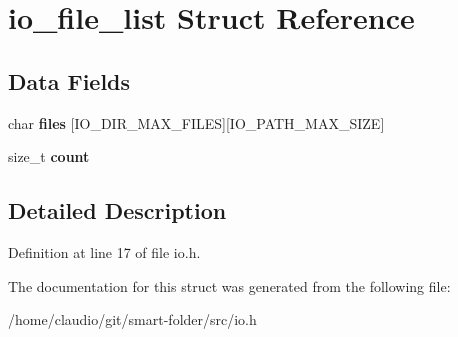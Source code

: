 \hypertarget{structio__file__list}{}\section{io\+\_\+file\+\_\+list Struct Reference}
\label{structio__file__list}
\subsection*{Data Fields}
\begin{DoxyCompactItemize}
\item 
char {\bfseries files} \mbox{[}I\+O\+\_\+\+D\+I\+R\+\_\+\+M\+A\+X\+\_\+\+F\+I\+L\+ES\mbox{]}\mbox{[}I\+O\+\_\+\+P\+A\+T\+H\+\_\+\+M\+A\+X\+\_\+\+S\+I\+ZE\mbox{]}\hypertarget{structio__file__list_aea2e7d487e7a0ce1737212bb7679dbcc}{}\label{structio__file__list_aea2e7d487e7a0ce1737212bb7679dbcc}

\item 
size\+\_\+t {\bfseries count}\hypertarget{structio__file__list_a76d971a3c552bc58ba9f0d5fceae9806}{}\label{structio__file__list_a76d971a3c552bc58ba9f0d5fceae9806}

\end{DoxyCompactItemize}


\subsection{Detailed Description}


Definition at line 17 of file io.\+h.



The documentation for this struct was generated from the following file\+:\begin{DoxyCompactItemize}
\item 
/home/claudio/git/smart-\/folder/src/io.\+h\end{DoxyCompactItemize}
